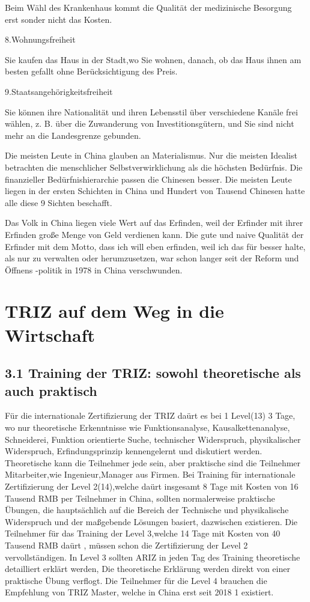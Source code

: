 \documentclass[11pt,a4paper]{article}
\begin{document}
Beim Wähl des Krankenhaus kommt die Qualität der medizinische Besorgung erst
sonder nicht das Kosten.

8.Wohnungsfreiheit

Sie kaufen das Haus in der Stadt,wo Sie wohnen, danach, ob das Haus ihnen am
besten gefallt ohne Berücksichtigung des Preis.

9.Staatsangehörigkeitsfreiheit

Sie können ihre Nationalität und ihren Lebensstil über verschiedene Kanäle
frei wählen, z. B. über die Zuwanderung von Investitionsgütern, und Sie sind
nicht mehr an die Landesgrenze gebunden. 

Die meisten Leute in China glauben an Materialismus. Nur die meisten Idealist
betrachten die menschlicher Selbstverwirklichung als die höchsten
Bedürfnis. Die finanzieller Bedürfnishierarchie passen die Chinesen
besser. Die meisten Leute liegen in der ersten Schichten in China und Hundert
von Tausend Chinesen hatte alle diese 9 Sichten beschafft. 

Das Volk in China liegen viele Wert auf das Erfinden, weil der Erfinder mit
ihrer Erfinden große Menge von Geld verdienen kann. Die gute und naive
Qualität der Erfinder mit dem Motto, dass ich will eben erfinden, weil ich das
für besser halte, als nur zu verwalten oder herumzusetzen, war schon langer
seit der Reform und Öffnens -politik in 1978 in China verschwunden.

\section{TRIZ auf dem Weg in die Wirtschaft}

\subsection{3.1   Training der TRIZ: sowohl theoretische als auch praktisch}

Für die internationale Zertifizierung der TRIZ daürt es bei 1 Level(13) 3
Tage, wo nur theoretische Erkenntnisse wie Funktionsanalyse,
Kausalkettenanalyse, Schneiderei, Funktion orientierte Suche, technischer
Widerspruch, physikalischer Widerspruch, Erfindungsprinzip kennengelernt und
diskutiert werden. Theoretische kann die Teilnehmer jede sein, aber praktische
sind die Teilnehmer Mitarbeiter,wie Ingenieur,Manager aus Firmen. Bei Training
für internationale Zertifizierung der Level 2(14),welche daürt insgesamt 8
Tage mit Kosten von 16 Tausend RMB per Teilnehmer in China, sollten
normalerweise praktische Übungen, die hauptsächlich auf die Bereich der
Technische und physikalische Widerspruch und der maßgebende Lösungen basiert,
dazwischen existieren. Die Teilnehmer für das Training der Level 3,welche 14
Tage mit Kosten von 40 Tausend RMB daürt , müssen schon die Zertifizierung
der Level 2 vervollständigen. In Level 3 sollten ARIZ in jeden Tag des
Training theoretische detailliert erklärt werden, Die theoretische Erklärung
werden direkt von einer praktische Übung verflogt. Die Teilnehmer für die
Level 4 brauchen die Empfehlung von TRIZ Master, welche in China erst seit
2018 1 existiert.
\end{document}
